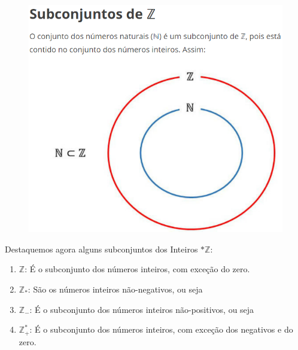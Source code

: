 \begin{multicols*}{2}
	\begin{figure}[H]
		\centering
		\includegraphics[width=\columnwidth]{assets/Conjunto dos Inteiros Mais os Naturais Nele Contido.png}
	\end{figure}

	Destaquemos agora alguns subconjuntos dos Inteiros $*\mathbb{Z}$:

	\begin{enumerate}

		\item $\mathbb{Z}$: É o subconjunto dos números inteiros, com exceção do zero. 

		\item $\mathbb{Z}_*$: São os números inteiros não-negativos, ou seja 

		\item $\mathbb{Z}_-$: É o subconjunto dos números inteiros não-positivos, ou seja 

		\item $\mathbb{Z}^*_+ $: É o subconjunto dos números inteiros, com exceção dos negativos e do zero.


\end{enumerate}
\end{multicols*}
